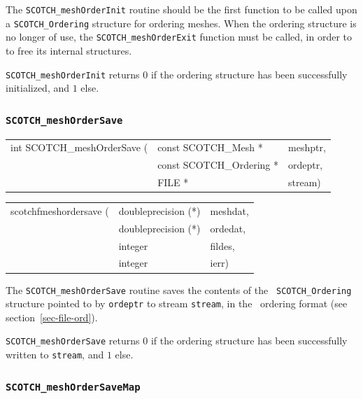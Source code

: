 \begin{itemize}
The {\tt SCOTCH\_\lbt mesh\lbt Order\lbt Init} routine should be the
first function to be called upon a {\tt SCOTCH\_\lbt Ordering}
structure for ordering meshes. When the ordering structure is no
longer of use, the {\tt SCOTCH\_\lbt mesh\lbt Order\lbt Exit}
function must be called, in order to to free its internal structures.

\progret

{\tt SCOTCH\_meshOrderInit} returns $0$ if the ordering structure has
been successfully initialized, and $1$ else.
\end{itemize}

\subsubsection{{\tt SCOTCH\_meshOrderSave}}

\begin{itemize}
\progsyn

{\tt\begin{tabular}{l@{}ll}
int SCOTCH\_meshOrderSave ( & const SCOTCH\_Mesh *     & meshptr, \\
                            & const SCOTCH\_Ordering * & ordeptr, \\
                            & FILE *                   & stream)
\end{tabular}}

{\tt\begin{tabular}{l@{}ll}
scotchfmeshordersave ( & doubleprecision (*) & meshdat, \\
                       & doubleprecision (*) & ordedat, \\
                       & integer             & fildes,  \\
                       & integer             & ierr)
\end{tabular}}

\progdes

The {\tt SCOTCH\_meshOrderSave} routine saves the contents of the {\tt
SCOTCH\_\lbt Ordering} structure pointed to by {\tt ordeptr} to stream
{\tt stream}, in the \scotch\ ordering format (see
section~\ref{sec-file-ord}).

\progret

{\tt SCOTCH\_meshOrderSave} returns $0$ if the ordering structure
has been successfully written to {\tt stream}, and $1$ else.
\end{itemize}

\subsubsection{{\tt SCOTCH\_meshOrderSaveMap}}

